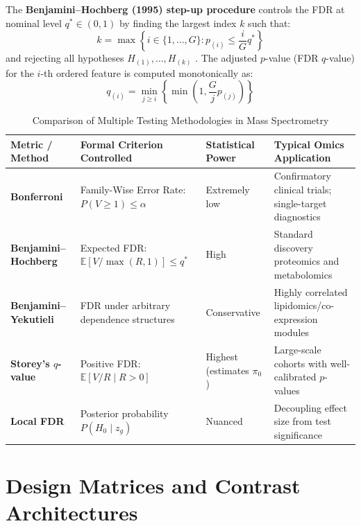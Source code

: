 \documentclass[11pt,twoside,openright]{book}
\begin{document}
\noindent
The \textbf{Benjamini--Hochberg (1995) step-up procedure} controls the FDR at nominal level $q^* \in (0, 1)$ by finding the largest index $k$ such that:
\begin{equation}
k = \max \left\{ i \in \{1, \dots, G\} : p_{(i)} \le \frac{i}{G} q^* \right\}
\label{eq:bh_procedure}
\end{equation}
and rejecting all hypotheses $H_{(1)}, \dots, H_{(k)}$ \cite{benjamini1995controlling}. The adjusted $p$-value (FDR $q$-value) for the $i$-th ordered feature is computed monotonically as:
\begin{equation}
q_{(i)} = \min_{j \ge i} \left\{ \min\left(1, \frac{G}{j} p_{(j)}\right) \right\}
\label{eq:bh_adjusted_p}
\end{equation}

\begin{table}[ht]
\centering
\caption{Comparison of Multiple Testing Methodologies in Mass Spectrometry}
\label{tab:fdr_comparison}
\small
\begin{tabularx}{\textwidth}{lXXX}
\toprule
\textbf{Metric / Method} & \textbf{Formal Criterion Controlled} & \textbf{Statistical Power} & \textbf{Typical Omics Application} \\
\midrule
\textbf{Bonferroni} & Family-Wise Error Rate: $P(V \ge 1) \le \alpha$ & Extremely low & Confirmatory clinical trials; single-target diagnostics \\
\textbf{Benjamini--Hochberg} \cite{benjamini1995controlling} & Expected FDR: $\mathbb{E}[V / \max(R, 1)] \le q^*$ & High & Standard discovery proteomics and metabolomics \\
\textbf{Benjamini--Yekutieli} \cite{benjamini2001control} & FDR under arbitrary dependence structures & Conservative & Highly correlated lipidomics/co-expression modules \\
\textbf{Storey's $q$-value} \cite{storey2003statistical} & Positive FDR: $\mathbb{E}[V / R \mid R > 0]$ & Highest (estimates $\pi_0$) & Large-scale cohorts with well-calibrated $p$-values \\
\textbf{Local FDR} \cite{efron2004large} & Posterior probability $P(H_0 \mid z_g)$ & Nuanced & Decoupling effect size from test significance \\
\bottomrule
\end{tabularx}
\end{table}

\section{Design Matrices and Contrast Architectures}
\end{document}
